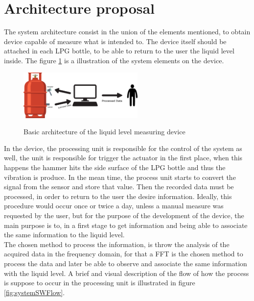\section{Architecture proposal}
The system architecture consist in the union of the elements mentioned, to obtain device capable of measure what is intended to. The device itself should be attached in each LPG bottle, to be able to return to the user the liquid level inside. The figure \ref{fig:systemArch} is a illustration of the system elements on the device.\\
\begin{figure}[!htb]
    \centering
    \includegraphics[width=0.55\textwidth]{Chapters/3CHP/Images/bottleBaseAct.eps}
    \caption{Basic architecture of the liquid level measuring device}{}
    \label{fig:systemArch}
\end{figure}
In the device, the processing unit is responsible for the control of the system as well, the unit is responsible for trigger the actuator in the first place, when this happens the hammer hits the side surface of the LPG bottle and thus the vibration is produce. In the mean time, the process unit starts to convert the signal from the sensor and store that value. Then the recorded data must be processed, in order to return to the user the desire information. Ideally, this procedure would occur once or twice a day, unless a manual measure was requested by the user, but for the purpose of the development of the device, the main purpose is to, in a first stage to get information and being able to associate the same information to the liquid level.\\
The chosen method to process the information, is throw the analysis of the acquired data in the frequency domain, for that a FFT is the chosen method to process the data and later be able to observe and associate the same information with the liquid level. A brief and visual description of the flow of how the process is suppose to occur in the processing unit is illustrated in figure \ref{fig:systemSWFlow}. 
